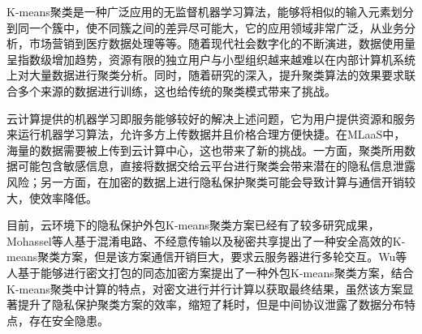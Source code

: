 %
%
%

K-means聚类是一种广泛应用的无监督机器学习算法，能够将相似的输入元素划分到同一个簇中，使不同簇之间的差异尽可能大，它的应用领域非常广泛，从业务分析，市场营销到医疗数据处理等等。随着现代社会数字化的不断演进，数据使用量呈指数级增加趋势，资源有限的独立用户与小型组织越来越难以在内部计算机系统上对大量数据进行聚类分析。同时，随着研究的深入，提升聚类算法的效果要求联合多个来源的数据进行训练，这也给传统的聚类模式带来了挑战。

云计算提供的机器学习即服务能够较好的解决上述问题，它为用户提供资源和服务来运行机器学习算法，允许多方上传数据并且价格合理方便快捷\cite{ribeiro2015mlaas}。在MLaaS中，海量的数据需要被上传到云计算中心，这也带来了新的挑战。一方面，聚类所用数据可能包含敏感信息，直接将数据交给云平台进行聚类会带来潜在的隐私信息泄露风险；另一方面，在加密的数据上进行隐私保护聚类可能会导致计算与通信开销较大，使效率降低。

目前，云环境下的隐私保护外包K-means聚类方案已经有了较多研究成果\cite{mohassel2019practical,wu2020secure,rong2017privacy,jaschke2019unsupervised}，Mohassel等人\cite{mohassel2019practical}基于混淆电路、不经意传输以及秘密共享提出了一种安全高效的K-means聚类方案，但是该方案通信开销巨大，要求云服务器进行多轮交互。Wu等人\cite{wu2020secure}基于能够进行密文打包的同态加密方案提出了一种外包K-means聚类方案，结合K-means聚类中计算的特点，对密文进行并行计算以获取最终结果，虽然该方案显著提升了隐私保护聚类方案的效率，缩短了耗时，但是中间协议泄露了数据分布特点，存在安全隐患。

